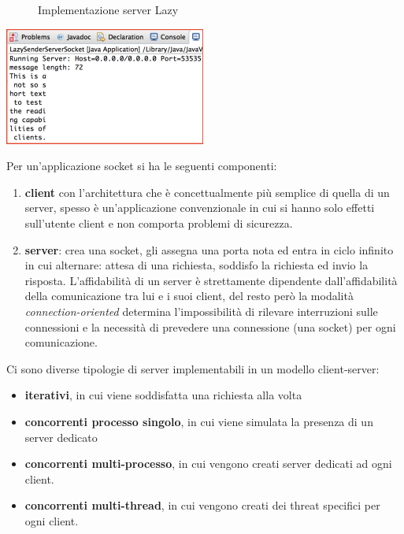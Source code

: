 \documentclass[a4paper,12pt, oneside]{book}
\begin{document}
\begin{figure}
    \caption{Implementazione server Lazy}
    \label{java:lazyServer}
    \inputminted{java}{code/JavaSocket/ServerWriter/LazySenderServerSocket.java}
\end{figure}

\begin{center}
	\includegraphics[scale=0.7]{img/lazy.png}
\end{center}
Per un'applicazione socket si ha le seguenti componenti:
\begin{enumerate}
	\item \textbf{client} con l'architettura che è concettualmente più semplice di quella di un server,
        spesso è un'applicazione convenzionale in cui si hanno solo effetti sull'utente client 
        e non comporta problemi di sicurezza.
	\item \textbf{server}: crea una socket, gli assegna una porta nota ed entra in ciclo infinito 
        in cui alternare: attesa di una richiesta, soddisfo la richiesta ed invio la risposta.\newline
	    L'affidabilità di un server è strettamente dipendente dall'affidabilità della comunicazione 
        tra lui e i suoi client, del resto però la modalità \textit{connection-oriented} determina 
        l'impossibilità di rilevare interruzioni sulle connessioni e la necessità di prevedere 
        una connessione (una socket) per ogni comunicazione.
\end{enumerate}
Ci sono diverse tipologie di server implementabili in un modello client-server:
\begin{itemize}
	\item \textbf{iterativi}, in cui viene soddisfatta una richiesta alla volta
	\item \textbf{concorrenti processo singolo}, in cui viene simulata la presenza di un server dedicato
	\item \textbf{concorrenti multi-processo}, in cui vengono creati server dedicati ad ogni client.
	\item \textbf{concorrenti multi-thread}, in cui vengono creati dei threat specifici per ogni client.
\end{itemize}
\end{document}
